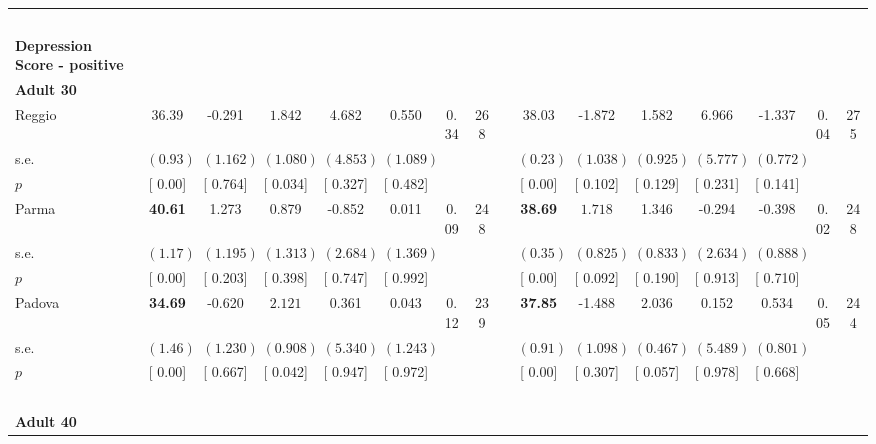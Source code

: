 \begin{longtable}{L{8em} c c c c c c c p{1em} c c c c c c c}
~\\[1em]
\textbf{Depression Score - positive} \\*
\quad \quad \textbf{Adult 30} & & & & & & & & & & & & & & & \\* 
\quad \quad \quad Reggio& 36.39 &    -0.291 & $ \mathbf{    1.842}$ &     4.682 &     0.550 &      0.34 &       268 & & 38.03 &    -1.872 &     1.582 &     6.966 &    -1.337 &      0.04 &       275  \\*
\quad \quad \quad \quad s.e.& $ (     0.93)$ & $ (    1.162)$ & $ (    1.080)$ & $ (    4.853)$ & $ (    1.089)$ & & & & $ (     0.23)$ & $ (    1.038)$ & $ (    0.925)$ & $ (    5.777)$ & $ (    0.772)$ & &  \\*
\quad \quad \quad \quad $ p$ & [     0.00] & [    0.764] & [    0.034] & [    0.327] & [    0.482] & & & & [     0.00] & [    0.102] & [    0.129] & [    0.231] & [    0.141] & &  \\[1em]
\quad \quad \quad Parma& \textbf{    40.61} &     1.273 &     0.879 &    -0.852 &     0.011 &      0.09 &       248 & & \textbf{    38.69} & $ \mathbf{    1.718}$ &     1.346 &    -0.294 &    -0.398 &      0.02 &       248  \\*
\quad \quad \quad \quad s.e.& $ (     1.17)$ & $ (    1.195)$ & $ (    1.313)$ & $ (    2.684)$ & $ (    1.369)$ & & & & $ (     0.35)$ & $ (    0.825)$ & $ (    0.833)$ & $ (    2.634)$ & $ (    0.888)$ & &  \\*
\quad \quad \quad \quad $ p$ & [     0.00] & [    0.203] & [    0.398] & [    0.747] & [    0.992] & & & & [     0.00] & [    0.092] & [    0.190] & [    0.913] & [    0.710] & &  \\[1em]
\quad \quad \quad Padova& \textbf{    34.69} &    -0.620 & $ \mathbf{    2.121}$ &     0.361 &     0.043 &      0.12 &       239 & & \textbf{    37.85} &    -1.488 & $ \mathbf{    2.036}$ &     0.152 &     0.534 &      0.05 &       244  \\*
\quad \quad \quad \quad s.e.& $ (     1.46)$ & $ (    1.230)$ & $ (    0.908)$ & $ (    5.340)$ & $ (    1.243)$ & & & & $ (     0.91)$ & $ (    1.098)$ & $ (    0.467)$ & $ (    5.489)$ & $ (    0.801)$ & &  \\*
\quad \quad \quad \quad $ p$ & [     0.00] & [    0.667] & [    0.042] & [    0.947] & [    0.972] & & & & [     0.00] & [    0.307] & [    0.057] & [    0.978] & [    0.668] & &  \\[1em]
~\\[1em]
\quad \quad \textbf{Adult 40} & & & & & & & & & & & & & & & \\* 

\end{longtable}
